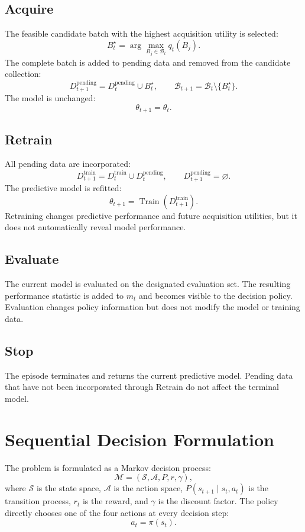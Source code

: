 \documentclass[11pt,letterpaper]{article}
\begin{document}
\subsection{Acquire}

The feasible candidate batch with the highest acquisition utility is selected:
\[
    B_t^\star=\arg\max_{B_j\in\mathcal{B}_t}q_t(B_j).
\]
The complete batch is added to pending data and removed from the candidate
collection:
\[
    D_{t+1}^{\mathrm{pending}}
    =
    D_t^{\mathrm{pending}}\cup B_t^\star,
    \qquad
    \mathcal{B}_{t+1}
    =
    \mathcal{B}_t\setminus\{B_t^\star\}.
\]
The model is unchanged:
\[
    \theta_{t+1}=\theta_t.
\]

\subsection{Retrain}

All pending data are incorporated:
\[
    D_{t+1}^{\mathrm{train}}
    =
    D_t^{\mathrm{train}}\cup D_t^{\mathrm{pending}},
    \qquad
    D_{t+1}^{\mathrm{pending}}=\varnothing.
\]
The predictive model is refitted:
\[
    \theta_{t+1}
    =
    \operatorname{Train}\!\left(D_{t+1}^{\mathrm{train}}\right).
\]
Retraining changes predictive performance and future acquisition utilities,
but it does not automatically reveal model performance.

\subsection{Evaluate}

The current model is evaluated on the designated evaluation set. The resulting
performance statistic is added to \(m_t\) and becomes visible to the decision
policy. Evaluation changes policy information but does not modify the model or
training data.

\subsection{Stop}

The episode terminates and returns the current predictive model. Pending data
that have not been incorporated through Retrain do not affect the terminal
model.

\section{Sequential Decision Formulation}

The problem is formulated as a Markov decision process:
\[
    \mathcal{M}=(\mathcal{S},\mathcal{A},P,r,\gamma),
\]
where \(\mathcal{S}\) is the state space, \(\mathcal{A}\) is the action space,
\(P(s_{t+1}\mid s_t,a_t)\) is the transition process, \(r_t\) is the reward,
and \(\gamma\) is the discount factor. The policy directly chooses one of the
four actions at every decision step:
\[
    a_t=\pi(s_t).
\]
\end{document}
